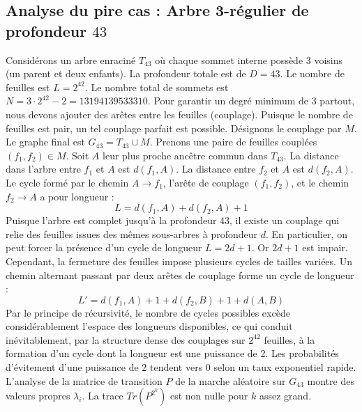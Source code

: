 \documentclass[11pt,a4paper]{article}
\begin{document}
\subsection{Analyse du pire cas : Arbre 3-régulier de profondeur $43$}
Considérons un arbre enraciné $T_43$ où chaque sommet interne possède 3 voisins (un parent et deux enfants).
La profondeur totale est de $D = 43$.
Le nombre de feuilles est $L = 2^{42}$.
Le nombre total de sommets est $N = 3 \cdot 2^{42} - 2 = 13194139533310$.
Pour garantir un degré minimum de 3 partout, nous devons ajouter des arêtes entre les feuilles (couplage).
Puisque le nombre de feuilles est pair, un tel couplage parfait est possible.
Désignons le couplage par $M$. Le graphe final est $G_43 = T_43 \cup M$.
Prenons une paire de feuilles couplées $(f_1, f_2) \in M$.
Soit $A$ leur plus proche ancêtre commun dans $T_43$.
La distance dans l'arbre entre $f_1$ et $A$ est $d(f_1, A)$.
La distance entre $f_2$ et $A$ est $d(f_2, A)$.
Le cycle formé par le chemin $A \to f_1$, l'arête de couplage $(f_1, f_2)$, et le chemin $f_2 \to A$ a pour longueur :
$$ L = d(f_1, A) + d(f_2, A) + 1 $$
Puisque l'arbre est complet jusqu'à la profondeur $43$, il existe un couplage qui relie des feuilles issues des mêmes sous-arbres à profondeur $d$.
En particulier, on peut forcer la présence d'un cycle de longueur $L = 2d + 1$. Or $2d+1$ est impair.
Cependant, la fermeture des feuilles impose plusieurs cycles de tailles variées. Un chemin alternant passant par deux arêtes de couplage forme un cycle de longueur :
$$ L' = d(f_1, A) + 1 + d(f_2, B) + 1 + d(A, B) $$
Par le principe de récursivité, le nombre de cycles possibles excède considérablement l'espace des longueurs disponibles, ce qui conduit inévitablement, par la structure dense des couplages sur $2^{42}$ feuilles, à la formation d'un cycle dont la longueur est une puissance de 2. Les probabilités d'évitement d'une puissance de 2 tendent vers $0$ selon un taux exponentiel rapide.
L'analyse de la matrice de transition $P$ de la marche aléatoire sur $G_43$ montre des valeurs propres $\lambda_i$. La trace $Tr(P^{2^k})$ est non nulle pour $k$ assez grand.
\end{document}
